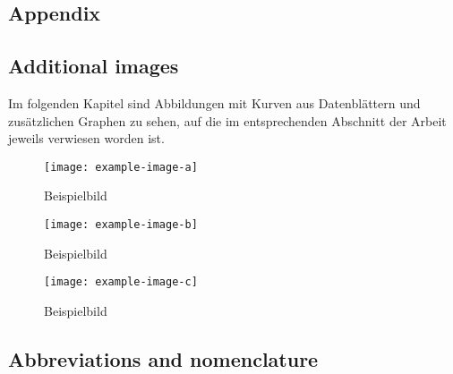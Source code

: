 
\begin{appendix}
\printbibliography
\chapter{Appendix}
 \section{Additional images}
 Im folgenden Kapitel sind Abbildungen mit Kurven aus Datenblättern und
 zusätzlichen Graphen zu sehen, auf die im entsprechenden Abschnitt der Arbeit
 jeweils verwiesen worden ist.

\begin{figure}
  \texttt{[image: example-image-a]}
  \caption{Beispielbild}
\end{figure}

\begin{figure}
  \texttt{[image: example-image-b]}
  \caption{Beispielbild}
\end{figure}

\begin{figure}
  \texttt{[image: example-image-c]}
  \caption{Beispielbild}
\end{figure}

 \FloatBarrier
 \newpage
\section{Abbreviations and nomenclature}
\printglossary[type=\acronymtype,title=Abkürzungen]
\printglossary[title=Notation]

\end{appendix}
